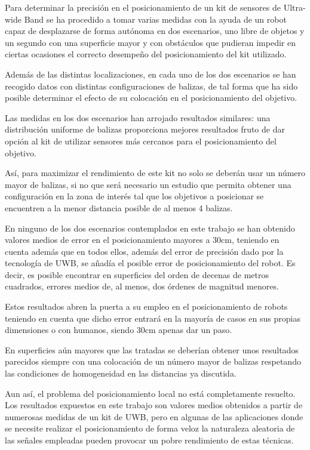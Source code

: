 Para determinar la precisión en el posicionamiento de un kit de sensores de Ultra-wide Band se ha procedido a tomar varias medidas con la ayuda de un robot capaz de desplazarse de forma autónoma en dos escenarios, uno libre de objetos y un segundo con una superficie mayor y con obstáculos que pudieran impedir en ciertas ocasiones el correcto desempeño del posicionamiento del kit utilizado.

Además de las distintas localizaciones, en cada uno de los dos escenarios se han recogido datos con distintas configuraciones de balizas, de tal forma que ha sido posible determinar el efecto de su colocación en el posicionamiento del objetivo.

Las medidas en los dos escenarios han arrojado resultados similares: una distribución uniforme de balizas proporciona mejores resultados fruto de dar opción al kit de utilizar sensores más cercanos para el posicionamiento del objetivo.

Así, para maximizar el rendimiento de este kit no solo se deberán usar un número mayor de balizas, si no que será necesario un estudio que permita obtener una configuración en la zona de interés tal que los objetivos a posicionar se encuentren a la menor distancia posible de al menos 4 balizas.

En ninguno de los dos escenarios contemplados en este trabajo se han obtenido valores medios de error en el posicionamiento mayores a 30cm, teniendo en cuenta además que en todos ellos, además del error de precisión dado por la tecnología de UWB, se añadía el posible error de posicionamiento del robot.
Es decir, es posible encontrar en superficies del orden de decenas de metros cuadrados, errores medios de, al menos, dos órdenes de magnitud menores.

Estos resultados abren la puerta a su empleo en el posicionamiento de robots teniendo en cuenta que dicho error entrará en la mayoría de casos en sus propias dimensiones o con humanos, siendo 30cm apenas dar un paso.

En superficies aún mayores que las tratadas se deberían obtener unos resultados parecidos siempre con una colocación de un número mayor de balizas respetando las condiciones de homogeneidad en las distancias ya discutida.

Aun así, el problema del posicionamiento local no está completamente resuelto.
Los resultados expuestos en este trabajo son valores medios obtenidos a partir de numerosas medidas de un kit de UWB, pero en algunas de las aplicaciones donde se necesite realizar el posicionamiento de forma veloz la naturaleza aleatoria de las señales empleadas pueden provocar un pobre rendimiento de estas técnicas.

